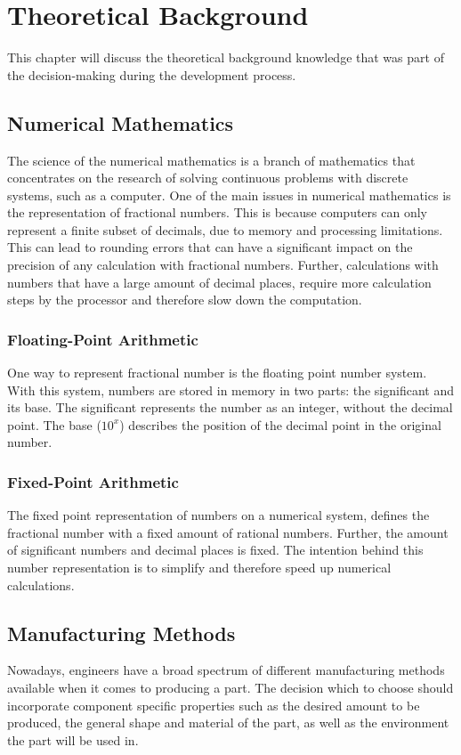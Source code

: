 \chapter{Theoretical Background}
\label{theoretical_background}
 
This chapter will discuss the theoretical background knowledge that was part of the decision-making during the development process.
 
\section{Numerical Mathematics}
The science of the numerical mathematics is a branch of mathematics that concentrates on the research of solving continuous problems with discrete systems, such as a computer.
One of the main issues in numerical mathematics is the representation of fractional numbers. This is because computers can only represent a finite subset of decimals, due to memory and processing limitations.
This can lead to rounding errors that can have a significant impact on the precision of any calculation with fractional numbers.
Further, calculations with numbers that have a large amount of decimal places, require more calculation steps by the processor and therefore slow down the computation.\cite{quarteroni2007numerical}
 
\subsection{Floating-Point Arithmetic}
One way to represent fractional number is the floating point number system. With this system, numbers are stored in memory in two parts: the significant and its base. The significant represents the number as an integer, without the decimal point.
The base ($10^x$) describes the position of the decimal point in the original number.\cite{quarteroni2007numerical}
 
\subsection{Fixed-Point Arithmetic}
The fixed point representation of numbers on a numerical system, defines the fractional number with a fixed amount of rational numbers. Further, the amount of significant numbers and decimal places is fixed.
The intention behind this number representation is to simplify and therefore speed up numerical calculations.\cite{quarteroni2007numerical}
 
\section{Manufacturing Methods}
Nowadays, engineers have a broad spectrum of different manufacturing methods available when it comes to producing a part.
The decision which to choose should incorporate component specific properties such as the desired amount to be produced,
the general shape and material of the part, as well as the environment the part will be used in.
 

